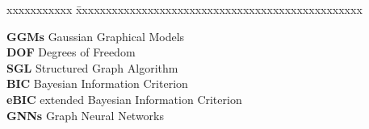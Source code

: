 \abbreviations

\noindent 
\begin{tabbing}
xxxxxxxxxxx \= xxxxxxxxxxxxxxxxxxxxxxxxxxxxxxxxxxxxxxxxxxxxxxxx \kill

\textbf{GGMs} \> Gaussian Graphical Models \\
\textbf{DOF} \> Degrees of Freedom \\
\textbf{SGL} \> Structured Graph Algorithm \\
\textbf{BIC} \> Bayesian Information Criterion \\
\textbf{eBIC} \> extended Bayesian Information Criterion \\
\textbf{GNNs} \> Graph Neural Networks \\
\end{tabbing}

\pagebreak